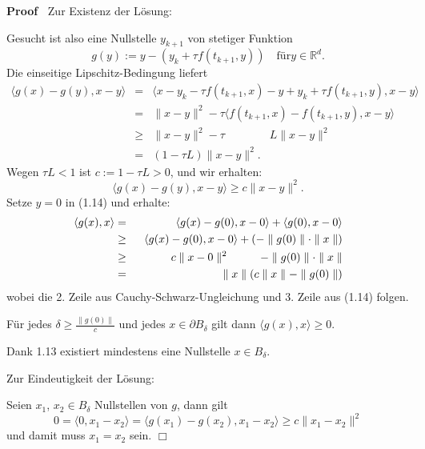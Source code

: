 \documentclass{book}
\newcommand{\assign}{:=}
\newenvironment{proof}{\noindent\textbf{Proof\ }}{\hspace*{\fill}$\Box$\medskip}
\begin{document}
\begin{proof}
  Zur Existenz der L{\"o}sung:
  
  Gesucht ist also eine Nullstelle $y_{k + 1}$ von stetiger Funktion
  \[ g (y) \assign y - (y_k + \tau f (t_{k + 1}, y)) \quad \text{f{\"u}r} y
     \in \mathbb{R}^d . \]
  {\hspace{1.7em}}Die einseitige Lipschitz-Bedingung liefert
  \begin{eqnarray*}
    \langle g (x) - g (y), x - y \rangle & = & \langle x - y_k - \tau f (t_{k
    + 1}, x) - y + y_k + \tau f (t_{k + 1}, y), x - y \rangle\\
    & = & \parallel x - y \parallel^2 - \tau \langle f (t_{k + 1}, x) - f
    (t_{k + 1}, y), x - y \rangle\\
    & \geq & \parallel x - y \parallel^2 - \tau \hspace{4em} L \parallel x -
    y \parallel^2\\
    & = & (1 - \tau L) \parallel x - y \parallel^2 .
  \end{eqnarray*}
  {\hspace{1.7em}}Wegen $\tau L < 1$ ist $c \assign 1 - \tau L > 0$, und wir
  erhalten:
  \begin{equation}
    \langle g (x) - g (y), x - y \rangle \geq c \parallel x - y \parallel^2 .
  \end{equation}
  {\hspace{1.7em}}Setze $y = 0$ in (1.14) und erhalte:
  \begin{eqnarray*}
    \langle g (x), x \rangle & = & \langle g (x) - g (0), x - 0 \rangle +
    \langle g (0), x - 0 \rangle\\
    & \geq & \langle g (x) - g (0), x - 0 \rangle + (- \parallel g (0)
    \parallel \cdot \parallel x \parallel)\\
    & \geq & \text{{\hspace{3em}}} c \parallel x - 0 \parallel^2
    \text{{\hspace{2.7em}}} - \parallel g (0) \parallel \cdot \parallel x
    \parallel\\
    & = & \parallel x \parallel (c \parallel x \parallel - \parallel g (0)
    \parallel)
  \end{eqnarray*}
  wobei die 2. Zeile aus Cauchy-Schwarz-Ungleichung und 3. Zeile aus (1.14)
  folgen.
  
  F{\"u}r jedes $\delta \geq \frac{\parallel g (0) \parallel}{c}$ und jedes $x
  \in \partial B_{\delta}$ gilt dann $\langle g (x), x \rangle \geq 0$.
  
  Dank 1.13 existiert mindestens eine Nullstelle $x \in B_{\delta}$.
  
  {\hspace{3em}}Zur Eindeutigkeit der L{\"o}sung:
  
  Seien $x_1$, $x_2 \in B_{\delta}$ Nullstellen von $g$, dann gilt
  \[ 0 = \langle 0, x_1 - x_2 \rangle = \langle g (x_1) - g (x_2), x_1 - x_2
     \rangle \geq c \parallel x_1 - x_2 \parallel^2 \]
  und damit muss $x_1 = x_2$ sein. 
\end{proof}
\end{document}
